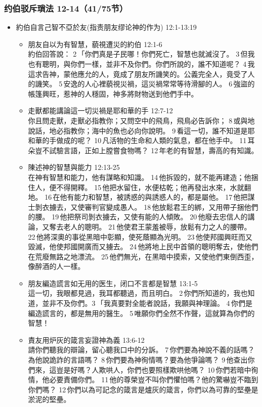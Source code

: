 \subsubsection{约伯驳斥瑣法 12-14（41/75节）}
\begin{itemize}
\itemsep-.45em 
\item 約伯自言己智不亞於友(指责朋友缪论神的作为) 12:1-13:19
\begin{itemize}
\itemsep-.45em 
\item 朋友自以为有智慧，藐視遭災的約伯 12:1-6\\
約伯回答說： 2 「你們真是子民哪！你們死亡，智慧也就滅沒了。 3 但我也有聰明，與你們一樣，並非不及你們。你們所說的，誰不知道呢？ 4 我這求告神，蒙他應允的人，竟成了朋友所譏笑的。公義完全人，竟受了人的譏笑。 5 安逸的人心裡藐視災禍，這災禍常常等待滑腳的人。 6 強盜的帳篷興旺，惹神的人穩固，神多將財物送到他們手中。
\item 走獸都能講論這一切災禍是耶和華的手 12:7-12\\
你且問走獸，走獸必指教你；又問空中的飛鳥，飛鳥必告訴你； 8 或與地說話，地必指教你；海中的魚也必向你說明。 9 看這一切，誰不知道是耶和華的手做成的呢？ 10 凡活物的生命和人類的氣息，都在他手中。 11 耳朵豈不試驗言語，正如上膛嘗食物嗎？ 12 年老的有智慧，壽高的有知識。
\item 陳述神的智慧與能力 12:13-25\\
在神有智慧和能力，他有謀略和知識。 14 他拆毀的，就不能再建造；他捆住人，便不得開釋。 15 他把水留住，水便枯乾；他再發出水來，水就翻地。 16 在他有能力和智慧，被誘惑的與誘惑人的，都是屬他。 17 他把謀士剝衣擄去，又使審判官變成愚人。 18 他放鬆君王的綁，又用帶子捆他們的腰。 19 他把祭司剝衣擄去，又使有能的人傾敗。 20 他廢去忠信人的講論，又奪去老人的聰明。 21 他使君王蒙羞被辱，放鬆有力之人的腰帶。 22 他將深奧的事從黑暗中彰顯，使死蔭顯為光明。 23 他使邦國興旺而又毀滅，他使邦國開廣而又擄去。 24 他將地上民中首領的聰明奪去，使他們在荒廢無路之地漂流。 25 他們無光，在黑暗中摸索，又使他們東倒西歪，像醉酒的人一樣。
\item 朋友編造謊言如无用的医生，闭口不言都是智慧 13:1-5\\
這一切，我眼都見過，我耳都聽過，而且明白。 2 你們所知道的，我也知道，並非不及你們。3 「我真要對全能者說話，我願與神理論。 4 你們是編造謊言的，都是無用的醫生。 5 唯願你們全然不作聲，這就算為你們的智慧！
\item 責友用炉灰的箴言妄證神為義 13:6-12\\
請你們聽我的辯論，留心聽我口中的分訴。 7 你們要為神說不義的話嗎？為他說詭詐的言語嗎？ 8 你們要為神徇情嗎？要為他爭論嗎？ 9 他查出你們來，這豈是好嗎？人欺哄人，你們也要照樣欺哄他嗎？ 10 你們若暗中徇情，他必要責備你們。 11 他的尊榮豈不叫你們懼怕嗎？他的驚嚇豈不臨到你們嗎？ 12 你們以為可記念的箴言是爐灰的箴言，你們以為可靠的堅壘是淤泥的堅壘。

\end{itemize}
\end{itemize}
